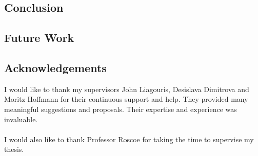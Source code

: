 \documentclass[11pt,singlecolumn]{scrartcl}
\begin{document}
\subsection{Conclusion}

\subsection{Future Work}
\subsection{Acknowledgements}
I would like to thank my supervisors John Liagouris, Desislava Dimitrova and Moritz Hoffmann for their continuous support and help. They provided many meaningful suggestions and proposals. Their expertise and experience was invaluable.\\\\
I would also like to thank Professor Roscoe for taking the time to supervise my thesis.

\clearpage


{}

\end{document}
